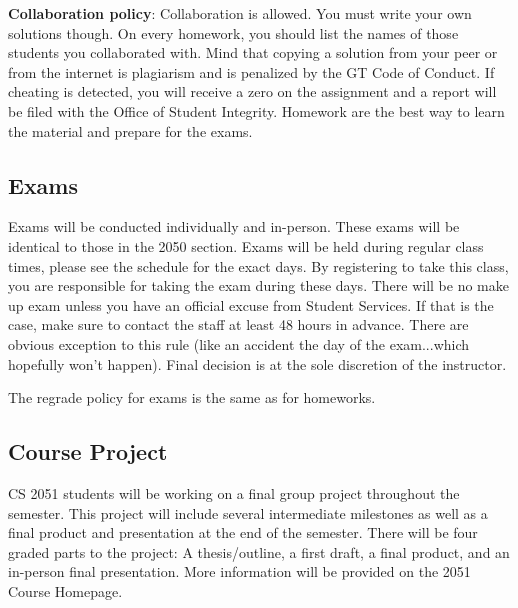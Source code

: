 \documentclass{article}
\begin{document}
    \vspace{3mm}
    \textbf{Collaboration policy}: Collaboration is allowed. You must write your own solutions though. On every homework, you should list the names of those students you collaborated with. Mind that copying a solution from your peer or from the internet is plagiarism and is penalized by the GT Code of Conduct. If cheating is detected, you will receive a zero on the assignment and a report will be filed with the Office of Student Integrity. Homework are the best way to learn the material and prepare for the exams.

\subsection*{Exams}
    Exams will be conducted individually and in-person. These exams will be identical to those in the 2050 section. Exams will be held during regular class times, please see the schedule for the exact days. By registering to take this class, you are responsible for taking the exam during these days. There will be no make up exam unless you have an official excuse from Student Services. If that is the case, make sure to contact the staff at least 48 hours in advance. There are obvious exception to this rule (like an accident the day of the exam...which hopefully won’t happen). Final decision is at the sole discretion of the instructor.

    \vspace{3mm}
    The regrade policy for exams is the same as for homeworks.

\subsection*{Course Project}
    CS 2051 students will be working on a final group project throughout the semester. This project will include several intermediate milestones as well as a final product and presentation at the end of the semester. There will be four graded parts to the project: A thesis/outline, a first draft, a final product, and an in-person final presentation. More information will be provided on the 2051 Course Homepage.
\end{document}
